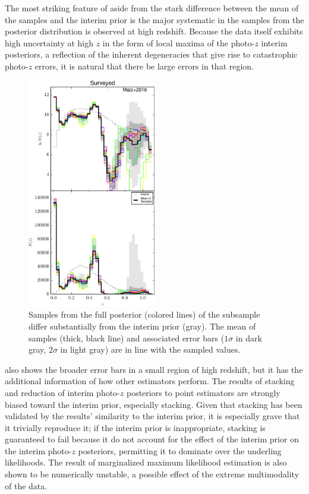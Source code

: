 The most striking feature of  aside from the stark difference between the mean of the samples and the interim prior is the major systematic in the samples from the posterior distribution is observed at high redshift.  
Because the data itself exhibits high uncertainty at high $z$ in the form of local maxima of the photo-$z$ interim posteriors, a reflection of the inherent degeneracies that give rise to catastrophic photo-$z$ errors, it is natural that there be large errors in that region.  

\begin{figure}
	\includegraphics[width=0.5\textwidth]{figures/chippr/boss_samps.pdf}
	\caption{Samples from the full posterior (colored lines) of the subsample differ substantially from the interim prior (gray).  
		The mean of samples (thick, black line) and associated error bars ($1\sigma$ in dark gray, $2\sigma$ in light gray) are in line with the sampled values.}
\end{figure}

 also shows the broader error bars in a small region of high redshift, but it has the additional information of how other estimators perform.  
The results of stacking and reduction of interim photo-$z$ posteriors to point estimators are strongly biased toward the interim prior, especially stacking.  
Given that stacking has been validated by the results' similarity to the interim prior, it is especially grave that it trivially reproduce it; if the interim prior is inappropriate, stacking is guaranteed to fail because it do not account for the effect of the interim prior on the interim photo-$z$ posteriors, permitting it to dominate over the underling likelihoods.  
The result of marginalized maximum likelihood estimation is also shown to be numerically unstable, a possible effect of the extreme multimodality of the data.  

